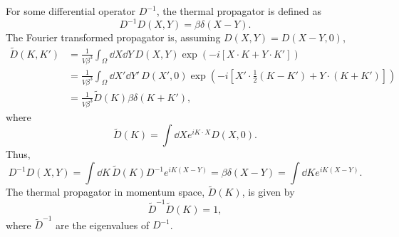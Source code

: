 For some differential operator $D^{-1}$, the thermal propagator is defined as
\begin{equation}
    D^{-1} D(X, Y) = \beta \delta(X - Y).
\end{equation}
The Fourier transformed propagator is, assuming $D(X, Y) = D(X-Y, 0)$,
\begin{align}
    \tilde D(K, K') 
    & = \frac{1}{V \beta^3} \int_{\Omega} \dd X \dd Y \, 
    D(X, Y) \exp(- i [X\cdot K + Y\cdot K']) \\
    & = \frac{1}{V \beta^3} \int_{\Omega} \dd X' \dd Y' \, D(X', 0) 
    \exp(- i [X'\cdot \frac{1}{2} (K - K') + Y\cdot (K + K')]) \\
    & = \frac{1}{V \beta^3} \tilde D(K) \beta \delta(K + K'),
\end{align}
where
\begin{equation}
    \tilde D(K) = \int \dd X e^{iK\cdot X} D(X, 0).
\end{equation}
Thus, 
\begin{equation}
    D^{-1} D(X, Y)
    =  \int \dd K \, \tilde D(K) D^{-1} e^{i K(X - Y)}
    = \beta \delta(X - Y)
    =  \int \dd K e^{iK(X - Y) }.
\end{equation}
The thermal propagator in momentum space, $\tilde D(K)$, is given by 
\begin{equation}
    \tilde D^{-1} \tilde D(K) = 1, 
\end{equation}
where $\tilde D^{-1}$ are the eigenvalues of $D^{-1}$.

